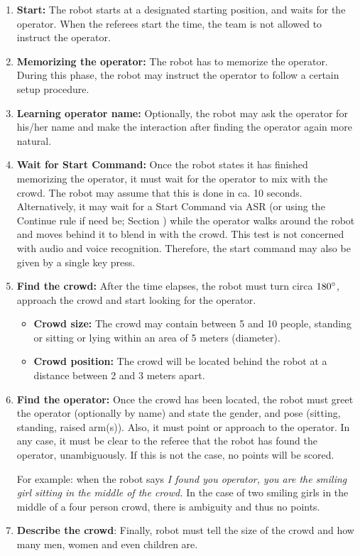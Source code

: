 \begin{enumerate}

\item \textbf{Start:} The robot starts at a designated starting position, and waits for the  operator. 
  When the referees start the time, the team is not allowed to instruct the operator.
\item \textbf{Memorizing the operator:} The robot has to memorize the operator. 
  During this phase, the robot may instruct the operator to follow a certain setup procedure.
\item \textbf{Learning operator name:} Optionally, the robot may ask the operator for his/her name and make the interaction after finding the operator again more natural.
\item \textbf{Wait for Start Command:} Once the robot states it has finished memorizing the operator, 
  it must wait for the operator to mix with the crowd. The robot may assume that this is done in ca. 10 seconds. 
  Alternatively, it may wait for a Start Command via ASR (or using the Continue rule if need be; Section ) while the operator walks around the robot and moves behind it to blend in with the crowd.
  This test is not concerned with audio and voice recognition. Therefore, the start command may also be given by a single key press.
\item \textbf{Find the crowd:} After the time elapses, the robot must turn circa $180\degree$, approach the crowd and start looking for the operator.
\begin{itemize}
\item \textbf{Crowd size:} The crowd may contain between 5 and 10 people, standing or sitting or lying within an  area of 5 meters (diameter).
\item \textbf{Crowd position:} The crowd will be located behind the robot at a distance between 2 and 3 meters apart.
\end{itemize}
\item \textbf{Find the operator:} Once the crowd has been located, the robot must greet the operator (optionally by name) and state the gender, and pose (sitting, standing, raised arm(s)).
  Also, it must point or approach to the operator. In any case, it must be clear to the referee that the robot has found the operator, unambiguously.
  If this is not the case, no points will be scored. 

  For example: when the robot says \textit{I found you operator, you are the smiling girl sitting in the middle of the crowd.}
  In the case of two smiling girls in the middle of a four person crowd, there is ambiguity and thus no points.

\item \textbf{Describe the crowd}: Finally, robot must tell the size of the crowd and how many men, women and even children are.
\end{enumerate}

